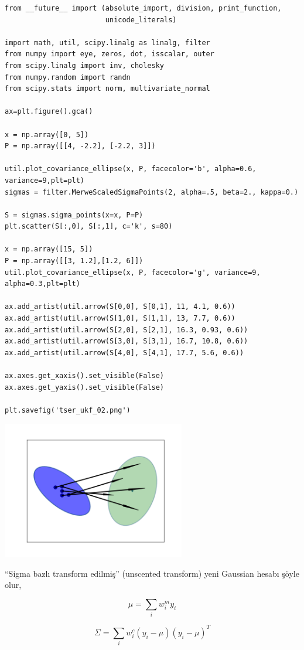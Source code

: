\documentclass[12pt,fleqn]{article}\usepackage{../../common}
\begin{document}
\begin{verbatim}
from __future__ import (absolute_import, division, print_function,
                        unicode_literals)

import math, util, scipy.linalg as linalg, filter
from numpy import eye, zeros, dot, isscalar, outer
from scipy.linalg import inv, cholesky
from numpy.random import randn
from scipy.stats import norm, multivariate_normal

ax=plt.figure().gca()

x = np.array([0, 5])
P = np.array([[4, -2.2], [-2.2, 3]])

util.plot_covariance_ellipse(x, P, facecolor='b', alpha=0.6, variance=9,plt=plt)
sigmas = filter.MerweScaledSigmaPoints(2, alpha=.5, beta=2., kappa=0.)

S = sigmas.sigma_points(x=x, P=P)
plt.scatter(S[:,0], S[:,1], c='k', s=80)

x = np.array([15, 5])
P = np.array([[3, 1.2],[1.2, 6]])
util.plot_covariance_ellipse(x, P, facecolor='g', variance=9, alpha=0.3,plt=plt)

ax.add_artist(util.arrow(S[0,0], S[0,1], 11, 4.1, 0.6))
ax.add_artist(util.arrow(S[1,0], S[1,1], 13, 7.7, 0.6))
ax.add_artist(util.arrow(S[2,0], S[2,1], 16.3, 0.93, 0.6))
ax.add_artist(util.arrow(S[3,0], S[3,1], 16.7, 10.8, 0.6))
ax.add_artist(util.arrow(S[4,0], S[4,1], 17.7, 5.6, 0.6))

ax.axes.get_xaxis().set_visible(False)
ax.axes.get_yaxis().set_visible(False)

plt.savefig('tser_ukf_02.png')
\end{verbatim}

\includegraphics[height=6cm]{tser_ukf_02.png}

``Sigma bazlı transform edilmiş'' (unscented transform) yeni Gaussian
hesabı şöyle olur,

$$ \mu = \sum_i w_i^m y_i $$

$$ \Sigma = \sum_i w_i^c (y_i-\mu)(y_i-\mu)^T $$
\end{document}
